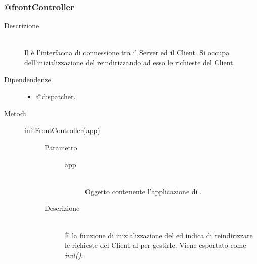 \subsubsection{@frontController}
\begin{description}
 \item[Descrizione] \hfill \\
 Il  è l'interfaccia di connessione tra il Server ed il Client. Si occupa dell'inizializzazione del  reindirizzando ad esso le richieste del Client.
 \item[Dipendendenze] \hfill
 \begin{itemize}
 \item @dispatcher.
 \end{itemize}
 \item[Metodi] \hfill
  \begin{description}
    \item[initFrontController(app)] \hfill 
    \begin{description}
       		\item[Parametro] \hfill
       			\begin{description}
       				\item[app] \hfill \\
       				Oggetto contenente l'applicazione di .
       			\end{description}
       		\item[Descrizione] \hfill \\
       		\`{E} la funzione di inizializzazione del  ed indica di reindirizzare le richieste del Client al  per gestirle. Viene esportato come \textit{init()}.
   \end{description}
  \end{description}
\end{description}

